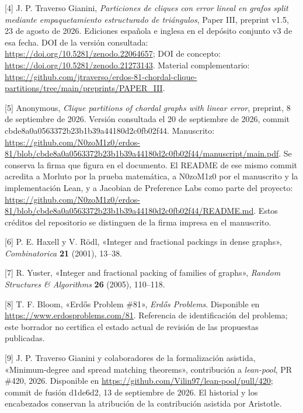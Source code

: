 \documentclass[spanish,11pt,a4paper]{article}
\begin{document}
{[}4{]} J. P. Traverso Gianini, \emph{Particiones de cliques con error lineal en grafos split mediante empaquetamiento estructurado de triángulos}, Paper III, preprint v1.5, 23 de agosto de 2026. Ediciones española e inglesa en el depósito conjunto v3 de esa fecha. DOI de la versión consultada: \url{https://doi.org/10.5281/zenodo.22064657}; DOI de concepto: \url{https://doi.org/10.5281/zenodo.21273143}. Material complementario: \url{https://github.com/jtraverso/erdos-81-chordal-clique-partitions/tree/main/preprints/PAPER_III}.

{[}5{]} Anonymous, \emph{Clique partitions of chordal graphs with linear error}, preprint, 8 de septiembre de 2026. Versión consultada el 20 de septiembre de 2026, commit {\ttfamily\small cbde8a0a0563\discretionary{\hbox{\ensuremath{\hookrightarrow}}}{}{}372b23b1b39a\discretionary{\hbox{\ensuremath{\hookrightarrow}}}{}{}44180d2c0fb0\discretionary{\hbox{\ensuremath{\hookrightarrow}}}{}{}2f44}. Manuscrito: \url{https://github.com/N0zoM1z0/erdos-81/blob/cbde8a0a0563372b23b1b39a44180d2c0fb02f44/manuscript/main.pdf}. Se conserva la firma que figura en el documento. El README de ese mismo commit acredita a Morluto por la prueba matemática, a N0zoM1z0 por el manuscrito y la implementación Lean, y a Jacobian de Preference Labs como parte del proyecto: \url{https://github.com/N0zoM1z0/erdos-81/blob/cbde8a0a0563372b23b1b39a44180d2c0fb02f44/README.md}. Estos créditos del repositorio se distinguen de la firma impresa en el manuscrito.

{[}6{]} P. E. Haxell y V. Rödl, «Integer and fractional packings in dense graphs», \emph{Combinatorica} \textbf{21} (2001), 13--38.

{[}7{]} R. Yuster, «Integer and fractional packing of families of graphs», \emph{Random Structures \& Algorithms} \textbf{26} (2005), 110--118.

{[}8{]} T. F. Bloom, «Erdős Problem \#81», \emph{Erdős Problems}. Disponible en \url{https://www.erdosproblems.com/81}. Referencia de identificación del problema; este borrador no certifica el estado actual de revisión de las propuestas publicadas.

{[}9{]} J. P. Traverso Gianini y colaboradores de la formalización asistida, «Minimum-degree and spread matching theorems», contribución a \emph{lean-pool}, PR \#420, 2026. Disponible en \url{https://github.com/Vilin97/lean-pool/pull/420}; commit de fusión {\ttfamily\small d1de6d2}, 13 de septiembre de 2026. El historial y los encabezados conservan la atribución de la contribución asistida por Aristotle.
\end{document}
